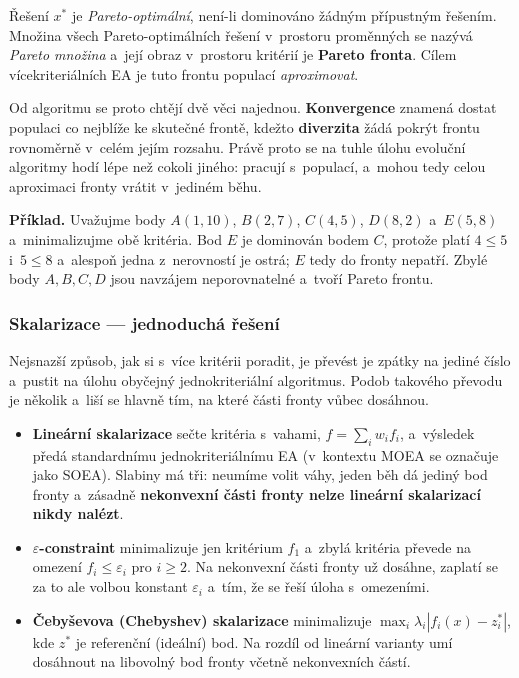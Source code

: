 \documentclass[11pt,a4paper]{article}
\theoremstyle{definition}
\begin{document}
\begin{defbox}
Řešení $x^*$ je \emph{Pareto-optimální}, není-li dominováno žádným přípustným řešením.
Množina všech Pareto-optimálních řešení v~prostoru proměnných se nazývá \emph{Pareto
množina} a~její obraz v~prostoru kritérií je \textbf{Pareto fronta}. Cílem
vícekriteriálních EA je tuto frontu populací \emph{aproximovat}.
\end{defbox}

Od algoritmu se proto chtějí dvě věci najednou. \textbf{Konvergence} znamená dostat
populaci co nejblíže ke skutečné frontě, kdežto \textbf{diverzita} žádá pokrýt frontu
rovnoměrně v~celém jejím rozsahu. Právě proto se na tuhle úlohu evoluční algoritmy hodí
lépe než cokoli jiného: pracují s~populací, a~mohou tedy celou aproximaci fronty vrátit
v~jediném běhu.

\textbf{Příklad.} Uvažujme body $A(1,10)$, $B(2,7)$, $C(4,5)$, $D(8,2)$ a~$E(5,8)$
a~minimalizujme obě kritéria. Bod $E$ je dominován bodem $C$, protože platí $4 \le 5$
i~$5 \le 8$ a~alespoň jedna z~nerovností je ostrá; $E$ tedy do fronty nepatří. Zbylé
body $A, B, C, D$ jsou navzájem neporovnatelné a~tvoří Pareto frontu.

\subsubsection{Skalarizace --- jednoduchá řešení}

Nejsnazší způsob, jak si s~více kritérii poradit, je převést je zpátky na jediné číslo
a~pustit na úlohu obyčejný jednokriteriální algoritmus. Podob takového převodu je několik
a~liší se hlavně tím, na které části fronty vůbec dosáhnou.

\begin{itemize}
\item \textbf{Lineární skalarizace} sečte kritéria s~vahami, $f = \sum_i w_i f_i$,
  a~výsledek předá standardnímu jednokriteriálnímu EA (v~kontextu MOEA se označuje jako
  SOEA). Slabiny má tři: neumíme volit váhy, jeden běh dá jediný bod fronty a~zásadně
  \textbf{nekonvexní části fronty nelze lineární skalarizací nikdy nalézt}.
\item \textbf{$\varepsilon$-constraint} minimalizuje jen kritérium $f_1$ a~zbylá kritéria
  převede na omezení $f_i \le \varepsilon_i$ pro $i \ge 2$. Na nekonvexní části fronty už
  dosáhne, zaplatí se za to ale volbou konstant $\varepsilon_i$ a~tím, že se řeší úloha
  s~omezeními.
\item \textbf{Čebyševova (Chebyshev) skalarizace} minimalizuje
  $\max_i \lambda_i |f_i(x) - z_i^*|$, kde $z^*$ je referenční (ideální) bod. Na rozdíl
  od lineární varianty umí dosáhnout na libovolný bod fronty včetně nekonvexních částí.
\end{itemize}
\end{document}
